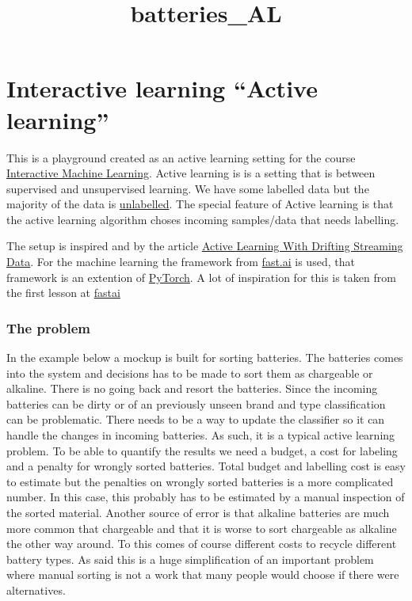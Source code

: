\documentclass[11pt]{article}
\title{batteries\_AL}
\begin{document}
    
    
    \maketitle
    
    

    
    \hypertarget{interactive-learning-active-learning}{%
\section{Interactive learning ``Active
learning''}\label{interactive-learning-active-learning}}

    This is a playground created as an active learning setting for the
course
\href{https://www.mah.se/upload/FAKULTETER/TS/Forskning/Kursplan\%20Interaktiv\%20maskininl\%C3\%A4rning.pdf}{Interactive
Machine Learning}. Active learning is is a setting that is between
supervised and unsupervised learning. We have some labelled data but the
majority of the data is
\href{https://en.wikipedia.org/wiki/Active_learning_(machine_learning)}{unlabelled}.
The special feature of Active learning is that the active learning
algorithm choses incoming samples/data that needs labelling.

The setup is inspired and by the article
\href{https://ieeexplore.ieee.org/document/6414645}{Active Learning With
Drifting Streaming Data}. For the machine learning the framework from
\href{http://www.fast.ai/}{fast.ai} is used, that framework is an
extention of \href{https://pytorch.org/}{PyTorch}. A lot of inspiration
for this is taken from the first lesson at
\href{http://course.fast.ai/}{fastai}

\hypertarget{the-problem}{%
\subsubsection{The problem}\label{the-problem}}

In the example below a mockup is built for sorting batteries. The
batteries comes into the system and decisions has to be made to sort
them as chargeable or alkaline. There is no going back and resort the
batteries. Since the incoming batteries can be dirty or of an previously
unseen brand and type classification can be problematic. There needs to
be a way to update the classifier so it can handle the changes in
incoming batteries. As such, it is a typical active learning problem. To
be able to quantify the results we need a budget, a cost for labeling
and a penalty for wrongly sorted batteries. Total budget and labelling
cost is easy to estimate but the penalties on wrongly sorted batteries
is a more complicated number. In this case, this probably has to be
estimated by a manual inspection of the sorted material. Another source
of error is that alkaline batteries are much more common that chargeable
and that it is worse to sort chargeable as alkaline the other way
around. To this comes of course different costs to recycle different
battery types. As said this is a huge simplification of an important
problem where manual sorting is not a work that many people would choose
if there were alternatives.
\end{document}
